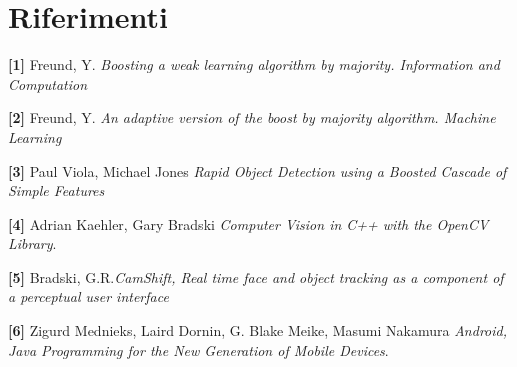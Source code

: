 
\chapter{Riferimenti} %
\label{Riferimenti} %



\textbf{[1]} Freund, Y. {\em Boosting a weak learning algorithm by majority. Information and Computation}

\textbf{[2]} Freund, Y. {\em An adaptive version of the boost by majority algorithm. Machine Learning}

\textbf{[3]} Paul Viola, Michael Jones {\em Rapid Object Detection using a Boosted Cascade of Simple Features}

\textbf{[4]} Adrian Kaehler, Gary Bradski {\em Computer Vision in C++ with the OpenCV Library}.

\textbf{[5]} Bradski, G.R.{\em CamShift, Real time face and object tracking as a component of a perceptual user interface}

\textbf{[6]} Zigurd Mednieks, Laird Dornin, G. Blake Meike, Masumi Nakamura {\em Android, Java Programming for the New Generation of Mobile Devices}.




